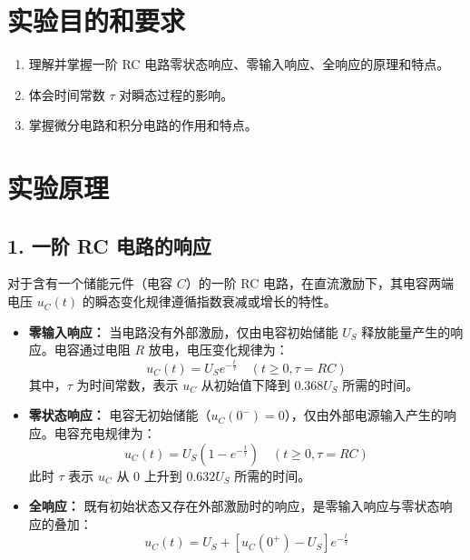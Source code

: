 \documentclass[10.5pt]{config}
\date{2026.4.9}
\begin{document}
\makeheader %

\section{实验目的和要求}

\begin{enumerate}[label=\arabic*., leftmargin=2em]
    \item 理解并掌握一阶 RC 电路零状态响应、零输入响应、全响应的原理和特点。
    \item 体会时间常数 $\tau$ 对瞬态过程的影响。
    \item 掌握微分电路和积分电路的作用和特点。
\end{enumerate}

\section{实验原理}

\subsection*{1. 一阶 RC 电路的响应}

对于含有一个储能元件（电容 $C$）的一阶 RC 电路，在直流激励下，其电容两端电压 $u_C(t)$ 的瞬态变化规律遵循指数衰减或增长的特性。
\begin{itemize}[leftmargin=2em]
    \item \textbf{零输入响应：} 当电路没有外部激励，仅由电容初始储能 $U_S$ 释放能量产生的响应。电容通过电阻 $R$ 放电，电压变化规律为：
    \begin{equation*}
        u_C(t) = U_S e^{-\frac{t}{\tau}} \quad (t \ge 0, \tau = RC)
    \end{equation*}
    其中，$\tau$ 为时间常数，表示 $u_C$ 从初始值下降到 $0.368U_S$ 所需的时间。
    
    \item \textbf{零状态响应：} 电容无初始储能（$u_C(0^-)=0$），仅由外部电源输入产生的响应。电容充电规律为：
    \begin{equation*}
        u_C(t) = U_S \left(1 - e^{-\frac{t}{\tau}}\right) \quad (t \ge 0, \tau = RC)
    \end{equation*}
    此时 $\tau$ 表示 $u_C$ 从 $0$ 上升到 $0.632U_S$ 所需的时间。

    \item \textbf{全响应：} 既有初始状态又存在外部激励时的响应，是零输入响应与零状态响应的叠加：
    \begin{equation*}
        u_C(t) = U_S + \left[u_C(0^+) - U_S\right] e^{-\frac{t}{\tau}}
    \end{equation*}
\end{itemize}
\end{document}
